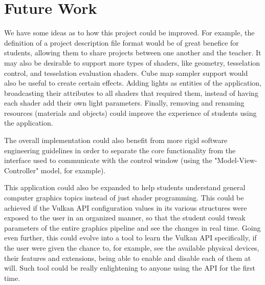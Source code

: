 \chapter{Future Work}
We have some ideas as to how this project could be improved. For example, the definition of a project description file format would be of great benefice for students, allowing them to share projects between one another and the teacher. It may also be desirable to support more types of shaders, like geometry, tesselation control, and tesselation evaluation shaders. Cube map sampler support would also be useful to create certain effects. Adding lights as entities of the application, broadcasting their attributes to all shaders that required them, instead of having each shader add their own light parameters. Finally, removing and renaming resources (materials and objects) could improve the experience of students using the application.

The overall implementation could also benefit from more rigid software engineering guidelines in order to separate the core functionality from the interface used to communicate with the control window (using the "Model-View-Controller" model, for example).

This application could also be expanded to help students understand general computer graphics topics instead of just shader programming. This could be achieved if the Vulkan API configuration values in its various structures were exposed to the user in an organized manner, so that the student could tweak parameters of the entire graphics pipeline and see the changes in real time. Going even further, this could evolve into a tool to learn the Vulkan API specifically, if the user were given the chance to, for example, see the available physical devices, their features and extensions, being able to enable and disable each of them at will. Such tool could be really enlightening to anyone using the API for the first time.
